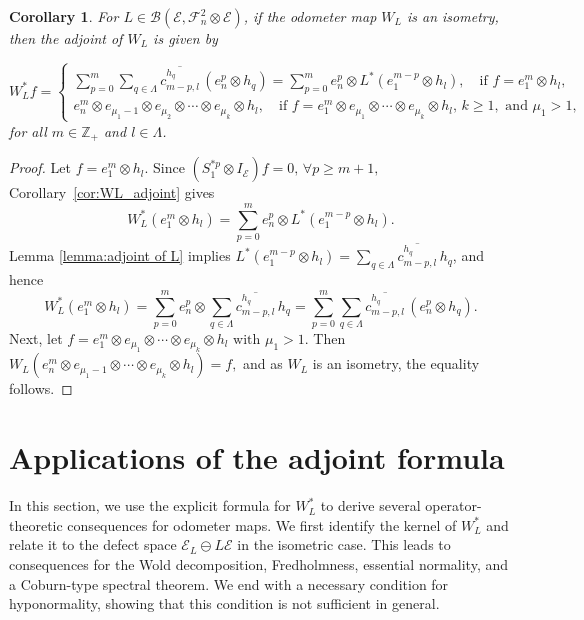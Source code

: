 \documentclass[12pt]{amsart}
\newtheorem{corollary}[theorem]{Corollary}
\theoremstyle{definition}
\theoremstyle{remark}
\def \Z{\mathbb{Z}}
\newcommand{\clb}{\mathcal{B}}
\newcommand{\cle}{\mathcal{E}}
\newcommand{\clf}{\mathcal{F}}
\newcommand{\ol}{\overline}
\numberwithin{equation}{section}
\begin{document}
\begin{corollary}\label{cor:isometric_adjoint}
For 
$L \in \clb(\cle, \clf_n^2 \otimes \cle)$, 
if the odometer map $W_L$ is an isometry, then the adjoint of $W_L$ is given by

\[
W_L^* f =
\begin{cases}
\displaystyle
\sum_{p=0}^{m} \sum_{q \in \Lambda} 
\overline{c^{h_q}_{m-p,l}}\, (e_n^p \otimes h_q)=\sum^m_{p=0}  e_{n}^p \otimes L^*(e_{1}^{m-p}\otimes h_l),\quad
\text{if } f = e_1^m \otimes h_l, \\[2mm]
e_n^m \otimes e_{\mu_1-1} \otimes e_{\mu_2} \otimes \cdots \otimes e_{\mu_k} \otimes h_l,\quad 
\text{if } f = e_1^m \otimes e_{\mu_1} \otimes \cdots \otimes e_{\mu_k} \otimes h_l,\, k \geq 1, \text{ and } \mu_1 > 1,
\end{cases}
\]
for all $m \in \Z_+$ and $l \in \Lambda$.
\end{corollary}

\begin{proof}
Let $f = e_1^m \otimes h_l$. Since $(S_1^{*p} \otimes I_\cle) f=0, \, \forall p \geq m+1,$
Corollary~\ref{cor:WL_adjoint} gives 
\[
W_L^*(e_1^m \otimes h_l)
=\sum^m_{p=0}  e_{n}^p \otimes L^*(e_{1}^{m-p}\otimes h_l).
\]
Lemma \ref{lemma:adjoint of L} implies $L^*(e_{1}^{m-p}\otimes h_l) = \sum_{q \in \Lambda} \ol{c^{h_q}_{{m-p},l}}\, h_q$, and hence
\[
W_L^*(e_1^m \otimes h_l)
=\sum^m_{p=0}  e_{n}^p \otimes \sum_{q \in \Lambda} \ol{c^{h_q}_{{m-p},l}}\, h_q 
= \sum^m_{p=0} \sum_{q \in \Lambda} \ol{c^{h_q}_{{m-p},l}}\, ( e_{n}^p \otimes  h_q).
\]
Next, let $f = e_1^m \otimes e_{\mu_1}\otimes\cdots\otimes e_{\mu_k}\otimes h_l \text{ with } \mu_1>1.$
Then $W_L(e_n^m \otimes e_{\mu_1-1}\otimes\cdots\otimes e_{\mu_k} \otimes h_l)=f,$ and as $W_L$ is an isometry, the 
equality follows. 
\end{proof}

\section{Applications of the adjoint formula}\label{sec:applications_adjoint}
In this section, we use the explicit formula for \(W_L^*\) to derive several
operator-theoretic consequences for odometer maps.
We first identify the kernel of $W_L^*$ and relate it to the defect space $\cle_L\ominus L\cle$ in the isometric case. This leads to consequences for the Wold decomposition,
Fredholmness, essential normality, and a Coburn-type spectral theorem. We end with a necessary condition for hyponormality, showing that this condition is not sufficient in general.
\end{document}
